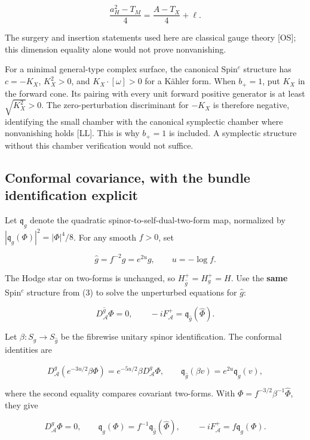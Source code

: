 \documentclass[
  11pt,
]{article}
\begin{document}
\[
\frac{a_H^2-T_M}{4}=\frac{A-T_X}{4}+\ell.
\]

The surgery and insertion statements used here are classical gauge
theory {[}OS{]}; this dimension equality alone would not prove
nonvanishing.

For a minimal general-type complex surface, the canonical Spin\(^c\)
structure has \(c=-K_X\), \(K_X^2>0\), and \(K_X\cdot[\omega]>0\) for a
Kähler form. When \(b_+=1\), put \(K_X\) in the forward cone. Its
pairing with every unit forward positive generator is at least
\(\sqrt{K_X^2}>0\). The zero-perturbation discriminant for \(-K_X\) is
therefore negative, identifying the small chamber with the canonical
symplectic chamber where nonvanishing holds {[}LL{]}. This is why
\(b_+=1\) is included. A symplectic structure without this chamber
verification would not suffice.

\hypertarget{conformal-covariance-with-the-bundle-identification-explicit}{%
\subsection{Conformal covariance, with the bundle identification
explicit}\label{conformal-covariance-with-the-bundle-identification-explicit}}

Let \(\mathfrak q_g\) denote the quadratic spinor-to-self-dual-two-form
map, normalized by \(|\mathfrak q_g(\Phi)|^2=|\Phi|^4/8\). For any
smooth \(f>0\), set

\[
\widehat g=f^{-2}g=e^{2u}g,\qquad u=-\log f.
\]

The Hodge star on two-forms is unchanged, so
\(H_{\widehat g}^+=H_g^+=H\). Use the \textbf{same} Spin\(^c\) structure
from (3) to solve the unperturbed equations for \(\widehat g\):

\[
D_{\mathcal A}^{\widehat g}\widehat\Phi=0,\qquad
-iF_{\mathcal A}^+=\mathfrak q_{\widehat g}(\widehat\Phi).
\]

Let \(\beta:S_g\to S_{\widehat g}\) be the fibrewise unitary spinor
identification. The conformal identities are

\[
D_{\mathcal A}^{\widehat g}(e^{-3u/2}\beta\Phi)
 =e^{-5u/2}\beta D_{\mathcal A}^{g}\Phi,
\qquad
\mathfrak q_{\widehat g}(\beta v)=e^{2u}\mathfrak q_g(v),
\]

where the second equality compares covariant two-forms. With
\(\Phi=f^{-3/2}\beta^{-1}\widehat\Phi\), they give

\[
D_{\mathcal A}^{g}\Phi=0,\qquad
\mathfrak q_g(\Phi)=f^{-1}\mathfrak q_{\widehat g}(\widehat\Phi),
\qquad -iF_{\mathcal A}^+=f\mathfrak q_g(\Phi).           \tag{5}
\]
\end{document}
